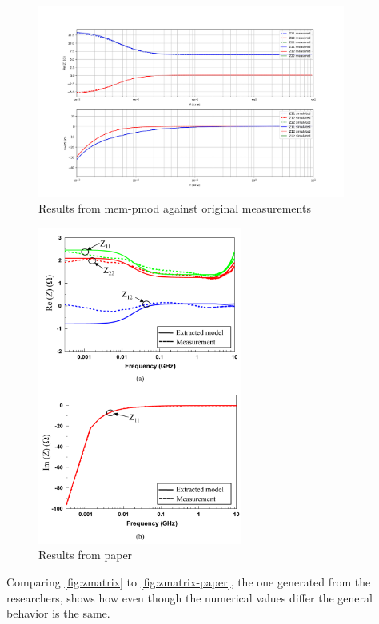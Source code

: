 \begin{figure}[htbp]
    \center
    \includegraphics[width = 0.9\textwidth]{img/zmatrix}
    \caption{Results from mem-pmod against original measurements}
    \label{fig:zmatrix}
\end{figure}

\begin{figure}[htbp]
    \center
    \includegraphics[width = 0.6\textwidth]{img/zmatrix-paper}
    \caption{Results from paper}
    \label{fig:zmatrix-paper}
\end{figure}


Comparing \autoref{fig:zmatrix} to \autoref{fig:zmatrix-paper}, the one generated from the researchers, shows how even though the numerical values differ the general behavior is the same.
